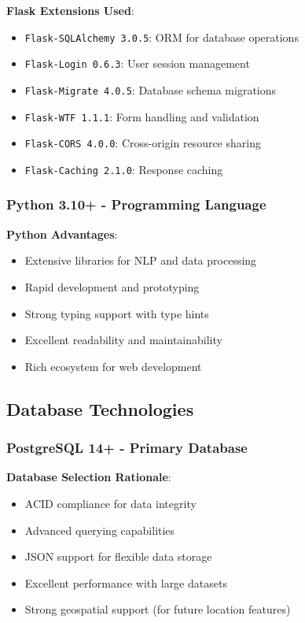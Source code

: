 \documentclass[12pt,a4paper]{article}
\begin{document}
\textbf{Flask Extensions Used}:
\begin{itemize}[leftmargin=*]
    \item \texttt{Flask-SQLAlchemy 3.0.5}: ORM for database operations
    \item \texttt{Flask-Login 0.6.3}: User session management
    \item \texttt{Flask-Migrate 4.0.5}: Database schema migrations
    \item \texttt{Flask-WTF 1.1.1}: Form handling and validation
    \item \texttt{Flask-CORS 4.0.0}: Cross-origin resource sharing
    \item \texttt{Flask-Caching 2.1.0}: Response caching
\end{itemize}

\subsubsection{Python 3.10+ - Programming Language}

\textbf{Python Advantages}:
\begin{itemize}[leftmargin=*]
    \item Extensive libraries for NLP and data processing
    \item Rapid development and prototyping
    \item Strong typing support with type hints
    \item Excellent readability and maintainability
    \item Rich ecosystem for web development
\end{itemize}

\subsection{Database Technologies}

\subsubsection{PostgreSQL 14+ - Primary Database}

\textbf{Database Selection Rationale}:
\begin{itemize}[leftmargin=*]
    \item ACID compliance for data integrity
    \item Advanced querying capabilities
    \item JSON support for flexible data storage
    \item Excellent performance with large datasets
    \item Strong geospatial support (for future location features)
\end{itemize}
\end{document}
